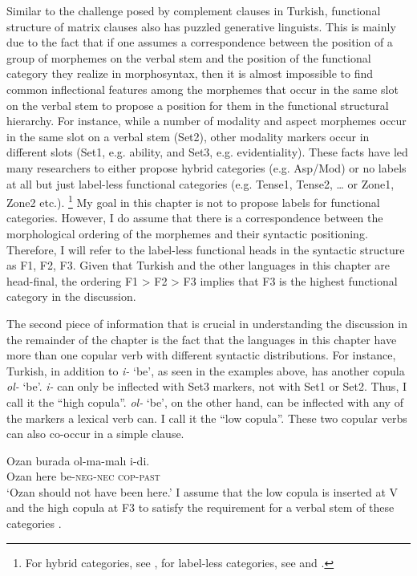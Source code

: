 \documentclass[output=paper]{langsci/langscibook}
\begin{document}
Similar to the challenge posed by complement clauses in Turkish, functional structure of matrix clauses also has puzzled generative linguists. 
This is mainly due to the fact that if one assumes a correspondence between the position of a group of morphemes on the verbal stem 
and the position of the functional category they realize in morphosyntax, then it is almost impossible to find common inflectional features 
among the morphemes that occur in the same slot on the verbal stem to propose a position for them in the functional structural hierarchy. 
For instance, while a number of modality and aspect morphemes occur in the same slot on a verbal stem (Set2), 
other modality markers occur in different slots (Set1, e.g. ability, and Set3, e.g. evidentiality). 
These facts have led many researchers to either propose hybrid categories (e.g. Asp/Mod) or no labels at all 
but just label-less functional categories (e.g. Tense1, Tense2, \ldots{} or Zone1, Zone2 etc.).%
\footnote{%
    For hybrid categories, see \citet{AygenTosun1998}, for label-less categories, see \citet{Sezer2001} and \citet{Enc2004}.
} 
My goal in this chapter is not to propose labels for functional categories. 
However, I do assume that there is a correspondence between the morphological ordering of the morphemes and their syntactic positioning. 
Therefore, I will refer to the label-less functional heads in the syntactic structure as F1, F2, F3. 
Given that Turkish and the other languages in this chapter are head-final, 
the ordering F1 > F2 > F3 implies that F3 is the highest functional category in the discussion. 

The second piece of information that is crucial in understanding the discussion in the remainder of the chapter 
is the fact that the languages in this chapter have more than one copular verb with different syntactic distributions. 
For instance, Turkish, in addition to \textit{i-} `be', as seen in the examples above, has another copula  \textit{ol-} `be'. 
\textit{i-} can only be inflected with Set3 markers, not with Set1 or Set2. 
Thus, I call it the ``high copula''. \textit{ol-} `be', on the other hand, can be inflected with any of the markers a lexical verb can. 
I call it the ``low copula''. These two copular verbs can also co-occur in a simple clause.

\ea%
    \label{kelepirex:key:6}
    \gll Ozan burada ol-ma-malı i-di.\\
    Ozan here be-\textsc{neg}{}-\textsc{nec} \textsc{cop}{}-\textsc{past}\\
    \glt `Ozan should not have been here.'
    \z
I assume that the low copula is inserted at V and the high copula at F3 to satisfy the requirement for a verbal stem of these categories 
\citep{Kelepir2001,Enc2004}.
\end{document}
